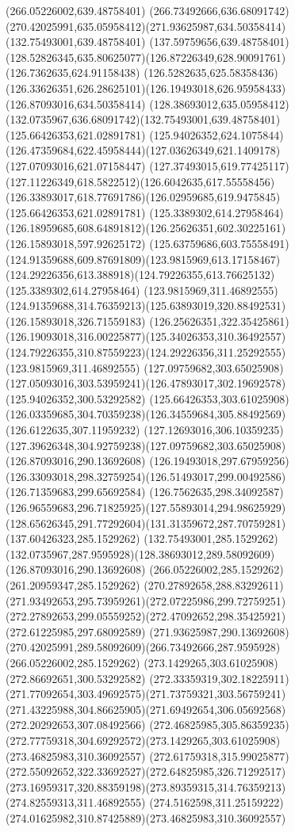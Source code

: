 {{\lineto(266.05226002,639.48758401)
\curveto(266.73492666,636.68091742)(270.42025991,635.05958412)(271.93625987,634.50358414)
\moveto(132.75493001,639.48758401)
\lineto(137.59759656,639.48758401)
\curveto(128.52826345,635.80625077)(126.87226349,628.90091761)(126.7362635,624.91158438)
\curveto(126.5282635,625.58358436)(126.33626351,626.28625101)(126.19493018,626.95958433)
\lineto(126.87093016,634.50358414)
\curveto(128.38693012,635.05958412)(132.0735967,636.68091742)(132.75493001,639.48758401)
\moveto(125.66426353,621.02891781)
\lineto(125.94026352,624.1075844)
\curveto(126.47359684,622.45958444)(127.03626349,621.1409178)(127.07093016,621.07158447)
\curveto(127.37493015,619.77425117)(127.11226349,618.5822512)(126.6042635,617.55558456)
\curveto(126.33893017,618.77691786)(126.02959685,619.9475845)(125.66426353,621.02891781)
\moveto(125.3389302,614.27958464)
\curveto(126.18959685,608.64891812)(126.25626351,602.30225161)(126.15893018,597.92625172)
\curveto(125.63759686,603.75558491)(124.91359688,609.87691809)(123.9815969,613.17158467)
\curveto(124.29226356,613.388918)(124.79226355,613.76625132)(125.3389302,614.27958464)
\moveto(123.9815969,311.46892555)
\curveto(124.91359688,314.76359213)(125.63893019,320.88492531)(126.15893018,326.71559183)
\curveto(126.25626351,322.35425861)(126.19093018,316.00225877)(125.34026353,310.36492557)
\curveto(124.79226355,310.87559223)(124.29226356,311.25292555)(123.9815969,311.46892555)
\moveto(127.09759682,303.65025908)
\curveto(127.05093016,303.53959241)(126.47893017,302.19692578)(125.94026352,300.53292582)
\lineto(125.66426353,303.61025908)
\curveto(126.03359685,304.70359238)(126.34559684,305.88492569)(126.6122635,307.11959232)
\curveto(127.12693016,306.10359235)(127.39626348,304.92759238)(127.09759682,303.65025908)
\moveto(126.87093016,290.13692608)
\lineto(126.19493018,297.67959256)
\curveto(126.33093018,298.32759254)(126.51493017,299.00492586)(126.71359683,299.65692584)
\curveto(126.7562635,298.34092587)(126.96559683,296.71825925)(127.55893014,294.98625929)
\curveto(128.65626345,291.77292604)(131.31359672,287.70759281)(137.60426323,285.1529262)
\lineto(132.75493001,285.1529262)
\curveto(132.0735967,287.9595928)(128.38693012,289.58092609)(126.87093016,290.13692608)
\moveto(266.05226002,285.1529262)
\lineto(261.20959347,285.1529262)
\curveto(270.27892658,288.83292611)(271.93492653,295.73959261)(272.07225986,299.72759251)
\curveto(272.27892653,299.05559252)(272.47092652,298.35425921)(272.61225985,297.68092589)
\lineto(271.93625987,290.13692608)
\curveto(270.42025991,289.58092609)(266.73492666,287.9595928)(266.05226002,285.1529262)
\moveto(273.1429265,303.61025908)
\lineto(272.86692651,300.53292582)
\curveto(272.33359319,302.18225911)(271.77092654,303.49692575)(271.73759321,303.56759241)
\curveto(271.43225988,304.86625905)(271.69492654,306.05692568)(272.20292653,307.08492566)
\curveto(272.46825985,305.86359235)(272.77759318,304.69292572)(273.1429265,303.61025908)
\moveto(273.46825983,310.36092557)
\curveto(272.61759318,315.99025877)(272.55092652,322.33692527)(272.64825985,326.71292517)
\curveto(273.16959317,320.88359198)(273.89359315,314.76359213)(274.82559313,311.46892555)
\curveto(274.5162598,311.25159222)(274.01625982,310.87425889)(273.46825983,310.36092557)
}
}
